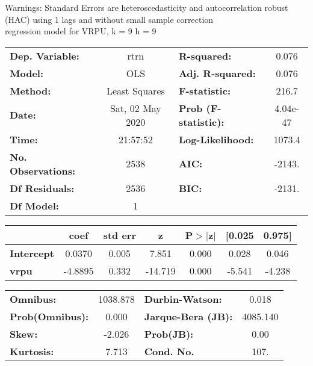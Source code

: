 Warnings: \newline
 [1] Standard Errors are heteroscedasticity and autocorrelation robust (HAC) using 1 lags and without small sample correction\\ 

regression model for VRPU, k = 9 h = 9\begin{center}
\begin{tabular}{lclc}
\toprule
\textbf{Dep. Variable:}    &       rtrn       & \textbf{  R-squared:         } &     0.076   \\
\textbf{Model:}            &       OLS        & \textbf{  Adj. R-squared:    } &     0.076   \\
\textbf{Method:}           &  Least Squares   & \textbf{  F-statistic:       } &     216.7   \\
\textbf{Date:}             & Sat, 02 May 2020 & \textbf{  Prob (F-statistic):} &  4.04e-47   \\
\textbf{Time:}             &     21:57:52     & \textbf{  Log-Likelihood:    } &    1073.4   \\
\textbf{No. Observations:} &        2538      & \textbf{  AIC:               } &    -2143.   \\
\textbf{Df Residuals:}     &        2536      & \textbf{  BIC:               } &    -2131.   \\
\textbf{Df Model:}         &           1      & \textbf{                     } &             \\
\bottomrule
\end{tabular}
\begin{tabular}{lcccccc}
                   & \textbf{coef} & \textbf{std err} & \textbf{z} & \textbf{P$> |$z$|$} & \textbf{[0.025} & \textbf{0.975]}  \\
\midrule
\textbf{Intercept} &       0.0370  &        0.005     &     7.851  &         0.000        &        0.028    &        0.046     \\
\textbf{vrpu}      &      -4.8895  &        0.332     &   -14.719  &         0.000        &       -5.541    &       -4.238     \\
\bottomrule
\end{tabular}
\begin{tabular}{lclc}
\textbf{Omnibus:}       & 1038.878 & \textbf{  Durbin-Watson:     } &    0.018  \\
\textbf{Prob(Omnibus):} &   0.000  & \textbf{  Jarque-Bera (JB):  } & 4085.140  \\
\textbf{Skew:}          &  -2.026  & \textbf{  Prob(JB):          } &     0.00  \\
\textbf{Kurtosis:}      &   7.713  & \textbf{  Cond. No.          } &     107.  \\
\bottomrule
\end{tabular}
\end{center}

